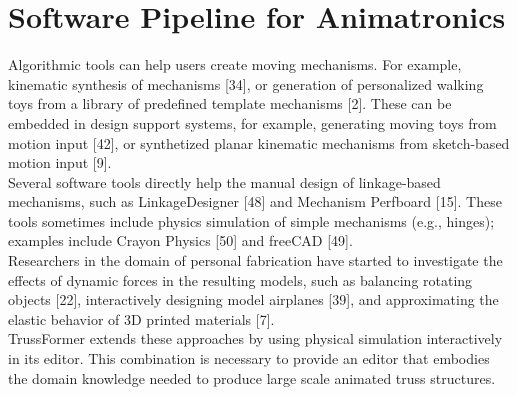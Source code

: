 \section{Software Pipeline for Animatronics}
Algorithmic tools can help users create moving mechanisms. For example, kinematic synthesis of mechanisms [34], or generation of personalized walking toys from a library of predefined template mechanisms [2]. These can be embedded in design support systems, for example, generating moving toys from motion input [42], or synthetized planar kinematic mechanisms from sketch-based motion input [9].\\
Several software tools directly help the manual design of linkage-based mechanisms, such as LinkageDesigner [48] and Mechanism Perfboard [15]. These tools sometimes include physics simulation of simple mechanisms (e.g., hinges); examples include Crayon Physics [50] and freeCAD [49].\\
Researchers in the domain of personal fabrication have started to investigate the effects of dynamic forces in the resulting models, such as balancing rotating objects [22], interactively designing model airplanes [39], and approximating the elastic behavior of 3D printed materials [7].\\
TrussFormer extends these approaches by using physical simulation interactively in its editor. This combination is necessary to provide an editor that embodies the domain knowledge needed to produce large scale animated truss structures.
